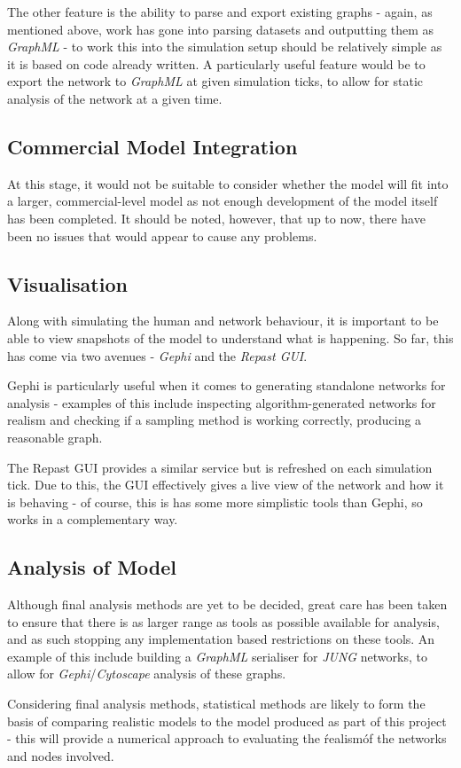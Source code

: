 \documentclass[]{article}
\begin{document}
The other feature is the ability to parse and export existing graphs - again, as mentioned above, work has gone into parsing datasets and outputting them as \emph{GraphML} - to work this into the simulation setup should be relatively simple as it is based on code already written. A particularly useful feature would be to export the network to \emph{GraphML} at given simulation ticks, to allow for static analysis of the network at a given time. 

\subsection{Commercial Model Integration}

At this stage, it would not be suitable to consider whether the model will fit into a larger, commercial-level model as not enough development of the model itself has been completed. It should be noted, however, that up to now, there have been no issues that would appear to cause any problems. 

\subsection{Visualisation}

Along with simulating the human and network behaviour, it is important to be able to view snapshots of the model to understand what is happening. So far, this has come via two avenues - \emph{Gephi} and the \emph{Repast GUI}. 

Gephi is particularly useful when it comes to generating standalone networks for analysis - examples of this include inspecting algorithm-generated networks for realism and checking if a sampling method is working correctly, producing a reasonable graph.

The Repast GUI provides a similar service but is refreshed on each simulation tick. Due to this, the GUI effectively gives a live view of the network and how it is behaving - of course, this is has some more simplistic tools than Gephi, so works in a complementary way.

\subsection{Analysis of Model}

Although final analysis methods are yet to be decided, great care has been taken to ensure that there is as larger range as tools as possible available for analysis, and as such stopping any implementation based restrictions on these tools. An example of this include building a \emph{GraphML} serialiser for \emph{JUNG} networks, to allow for \emph{Gephi}/\emph{Cytoscape} analysis of these graphs.

Considering final analysis methods, statistical methods are likely to form the basis of comparing realistic models to the model produced as part of this project - this will provide a numerical approach to evaluating the \'realism\' of the networks and nodes involved.



\end{document}
